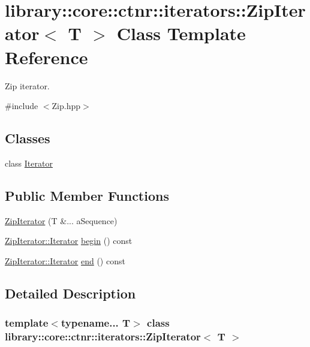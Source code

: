 \hypertarget{classlibrary_1_1core_1_1ctnr_1_1iterators_1_1_zip_iterator}{}\section{library\+:\+:core\+:\+:ctnr\+:\+:iterators\+:\+:Zip\+Iterator$<$ T $>$ Class Template Reference}
\label{classlibrary_1_1core_1_1ctnr_1_1iterators_1_1_zip_iterator}


Zip iterator.  




{\ttfamily \#include $<$Zip.\+hpp$>$}

\subsection*{Classes}
\begin{DoxyCompactItemize}
\item 
class \hyperlink{classlibrary_1_1core_1_1ctnr_1_1iterators_1_1_zip_iterator_1_1_iterator}{Iterator}
\end{DoxyCompactItemize}
\subsection*{Public Member Functions}
\begin{DoxyCompactItemize}
\item 
\hyperlink{classlibrary_1_1core_1_1ctnr_1_1iterators_1_1_zip_iterator_a3d8960d14f07cf22a2de2994eabe46aa}{Zip\+Iterator} (T \&... a\+Sequence)
\item 
\hyperlink{classlibrary_1_1core_1_1ctnr_1_1iterators_1_1_zip_iterator_1_1_iterator}{Zip\+Iterator\+::\+Iterator} \hyperlink{classlibrary_1_1core_1_1ctnr_1_1iterators_1_1_zip_iterator_a0467e25b565ac7b73b22a7002b87d189}{begin} () const
\item 
\hyperlink{classlibrary_1_1core_1_1ctnr_1_1iterators_1_1_zip_iterator_1_1_iterator}{Zip\+Iterator\+::\+Iterator} \hyperlink{classlibrary_1_1core_1_1ctnr_1_1iterators_1_1_zip_iterator_a91c3191909df9dcc737f14d9e38d9a78}{end} () const
\end{DoxyCompactItemize}


\subsection{Detailed Description}
\subsubsection*{template$<$typename... T$>$\newline
class library\+::core\+::ctnr\+::iterators\+::\+Zip\+Iterator$<$ T $>$}

